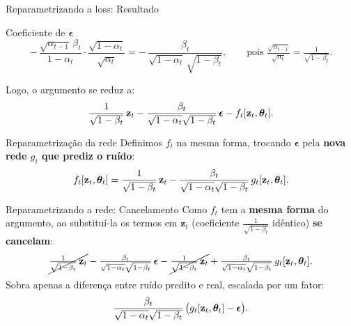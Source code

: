 \documentclass[aspectratio=169,xcolor=dvipsnames]{beamer}
\begin{document}
  \begin{frame}{Reparametrizando a loss: Resultado}
    \begin{block}{Coeficiente de $\boldsymbol{\epsilon}$}
      \[
        -\,\frac{\sqrt{\alpha_{t-1}}\,\beta_t}{1-\alpha_t}\cdot\frac{\sqrt{1-\alpha_t}}{\sqrt{\alpha_t}}
        = -\,\frac{\beta_t}{\sqrt{1-\alpha_t}\,\sqrt{1-\beta_t}},
        \qquad \text{pois } \tfrac{\sqrt{\alpha_{t-1}}}{\sqrt{\alpha_t}} = \tfrac{1}{\sqrt{1-\beta_t}}.
      \]
    \end{block}
    Logo, o argumento se reduz a:
    \[
      \frac{1}{\sqrt{1-\beta_t}}\, \mathbf{z}_t
      - \frac{\beta_t}{\sqrt{1-\alpha_t}\sqrt{1-\beta_t}}\,\boldsymbol{\epsilon}
      - f_t[\mathbf{z}_t,\bm{\theta}_t].
    \]
    \begin{block}{Reparametrização da rede}
      Definimos $f_t$ na mesma forma, trocando $\boldsymbol{\epsilon}$ pela
      \textbf{nova rede $g_t$ que prediz o ruído}:
      \[
        f_t[\mathbf{z}_t,\bm{\theta}_t] = \frac{1}{\sqrt{1-\beta_t}}\, \mathbf{z}_t
        - \frac{\beta_t}{\sqrt{1-\alpha_t}\sqrt{1-\beta_t}}\, g_t[\mathbf{z}_t,\bm{\theta}_t].
      \]
    \end{block}
  \end{frame}

  \begin{frame}{Reparametrizando a rede: Cancelamento}
    Como $f_t$ tem a \textbf{mesma forma} do argumento, ao substituí-la
    os termos em $\mathbf{z}_t$ (coeficiente $\tfrac{1}{\sqrt{1-\beta_t}}$ idêntico)
    \textbf{se cancelam}:
    \vspace{0.3em}
    \[
      \cancel{\tfrac{1}{\sqrt{1-\beta_t}}\, \mathbf{z}_t}
      - \tfrac{\beta_t}{\sqrt{1-\alpha_t}\sqrt{1-\beta_t}}\,\boldsymbol{\epsilon}
      - \cancel{\tfrac{1}{\sqrt{1-\beta_t}}\, \mathbf{z}_t}
      + \tfrac{\beta_t}{\sqrt{1-\alpha_t}\sqrt{1-\beta_t}}\, g_t[\mathbf{z}_t,\bm{\theta}_t].
    \]
    \vspace{0.2em}
    Sobra apenas a diferença entre ruído predito e real, escalada por um
    fator:
    \[
      \frac{\beta_t}{\sqrt{1-\alpha_t}\sqrt{1-\beta_t}}\,
      \big(g_t[\mathbf{z}_t,\bm{\theta}_t] - \boldsymbol{\epsilon}\big).
    \]
  \end{frame}
\end{document}
